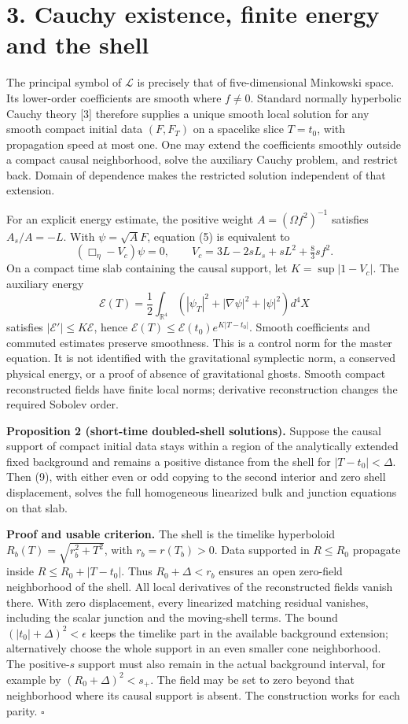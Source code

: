 \documentclass[
  10pt,
]{article}
\begin{document}
\section{3. Cauchy existence, finite energy and the
shell}\label{cauchy-existence-finite-energy-and-the-shell}

The principal symbol of \(\mathcal L\) is precisely that of
five-dimensional Minkowski space. Its lower-order coefficients are
smooth where \(f\ne0\). Standard normally hyperbolic Cauchy theory
{[}3{]} therefore supplies a unique smooth local solution for any smooth
compact initial data \((F,F_T)\) on a spacelike slice \(T=t_0\), with
propagation speed at most one. One may extend the coefficients smoothly
outside a compact causal neighborhood, solve the auxiliary Cauchy
problem, and restrict back. Domain of dependence makes the restricted
solution independent of that extension.

For an explicit energy estimate, the positive weight
\(A=(\Omega f^2)^{-1}\) satisfies \(A_s/A=-L\). With \(\psi=\sqrt A F\),
equation (5) is equivalent to \[
 (\Box_\eta-V_c)\psi=0,\qquad
 V_c=3L-2sL_s+sL^2+\tfrac83sf^2.                              \tag{12}
\] On a compact time slab containing the causal support, let
\(K=\sup|1-V_c|\). The auxiliary energy \[
 \mathcal E(T)=\frac12\int_{\mathbb R^4}
 (|\psi_T|^2+|\nabla\psi|^2+|\psi|^2)d^4X
\] satisfies \(|\mathcal E'|\le K\mathcal E\), hence
\(\mathcal E(T)\le\mathcal E(t_0)e^{K|T-t_0|}\). Smooth coefficients and
commuted estimates preserve smoothness. This is a control norm for the
master equation. It is not identified with the gravitational symplectic
norm, a conserved physical energy, or a proof of absence of
gravitational ghosts. Smooth compact reconstructed fields have finite
local norms; derivative reconstruction changes the required Sobolev
order.

\textbf{Proposition 2 (short-time doubled-shell solutions).} Suppose the
causal support of compact initial data stays within a region of the
analytically extended fixed background and remains a positive distance
from the shell for \(|T-t_0|<\Delta\). Then (9), with either even or odd
copying to the second interior and zero shell displacement, solves the
full homogeneous linearized bulk and junction equations on that slab.

\textbf{Proof and usable criterion.} The shell is the timelike
hyperboloid \(R_b(T)=\sqrt{r_b^2+T^2}\), with \(r_b=r(T_b)>0\). Data
supported in \(R\le R_0\) propagate inside \(R\le R_0+|T-t_0|\). Thus
\(R_0+\Delta<r_b\) ensures an open zero-field neighborhood of the shell.
All local derivatives of the reconstructed fields vanish there. With
zero displacement, every linearized matching residual vanishes,
including the scalar junction and the moving-shell terms. The bound
\((|t_0|+\Delta)^2<\epsilon\) keeps the timelike part in the available
background extension; alternatively choose the whole support in an even
smaller cone neighborhood. The positive-\(s\) support must also remain
in the actual background interval, for example by
\((R_0+\Delta)^2<s_+\). The field may be set to zero beyond that
neighborhood where its causal support is absent. The construction works
for each parity. \(\square\)
\end{document}
